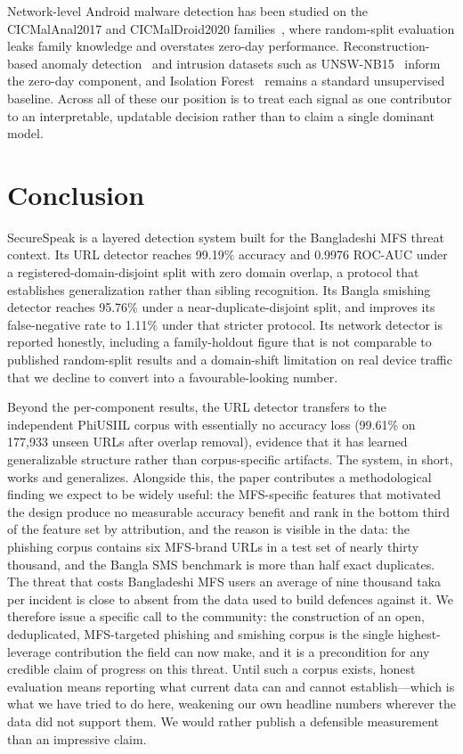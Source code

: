 \documentclass[preprint,12pt,number]{elsarticle}
\begin{document}
Network-level Android malware detection has been studied on the CICMalAnal2017 and CICMalDroid2020 families~\cite{lashkari2018,mahdavifar2020}, where random-split evaluation leaks family knowledge and overstates zero-day performance. Reconstruction-based anomaly detection~\cite{sakurada2014} and intrusion datasets such as UNSW-NB15~\cite{moustafa2015} inform the zero-day component, and Isolation Forest~\cite{liu2008} remains a standard unsupervised baseline. Across all of these our position is to treat each signal as one contributor to an interpretable, updatable decision rather than to claim a single dominant model.

\section{Conclusion}
SecureSpeak is a layered detection system built for the Bangladeshi MFS threat context. Its URL detector reaches 99.19\% accuracy and 0.9976 ROC-AUC under a registered-domain-disjoint split with zero domain overlap, a protocol that establishes generalization rather than sibling recognition. Its Bangla smishing detector reaches 95.76\% under a near-duplicate-disjoint split, and improves its false-negative rate to 1.11\% under that stricter protocol. Its network detector is reported honestly, including a family-holdout figure that is not comparable to published random-split results and a domain-shift limitation on real device traffic that we decline to convert into a favourable-looking number.

Beyond the per-component results, the URL detector transfers to the independent PhiUSIIL corpus with essentially no accuracy loss (99.61\% on 177{,}933 unseen URLs after overlap removal), evidence that it has learned generalizable structure rather than corpus-specific artifacts. The system, in short, works and generalizes. Alongside this, the paper contributes a methodological finding we expect to be widely useful: the MFS-specific features that motivated the design produce no measurable accuracy benefit and rank in the bottom third of the feature set by attribution, and the reason is visible in the data: the phishing corpus contains six MFS-brand URLs in a test set of nearly thirty thousand, and the Bangla SMS benchmark is more than half exact duplicates. The threat that costs Bangladeshi MFS users an average of nine thousand taka per incident is close to absent from the data used to build defences against it. We therefore issue a specific call to the community: the construction of an open, deduplicated, MFS-targeted phishing and smishing corpus is the single highest-leverage contribution the field can now make, and it is a precondition for any credible claim of progress on this threat. Until such a corpus exists, honest evaluation means reporting what current data can and cannot establish---which is what we have tried to do here, weakening our own headline numbers wherever the data did not support them. We would rather publish a defensible measurement than an impressive claim.
\end{document}
